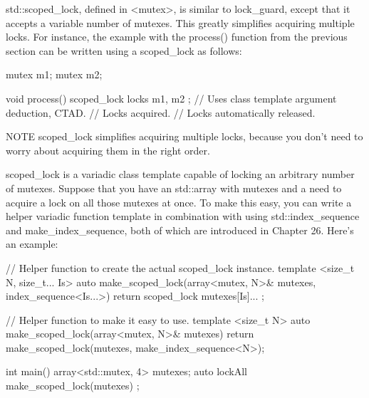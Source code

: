 
std::scoped\_lock, defined in <mutex>, is similar to lock\_guard, except that it accepts a variable number of mutexes. This greatly simplifies acquiring multiple locks. For instance, the example with the process() function from the previous section can be written using a scoped\_lock as follows:

\begin{cpp}
mutex m1;
mutex m2;

void process()
{
    scoped_lock locks { m1, m2 }; // Uses class template argument deduction, CTAD.
    // Locks acquired.
} // Locks automatically released.
\end{cpp}

\begin{myNotic}{NOTE}
scoped\_lock simplifies acquiring multiple locks, because you don’t need to worry about acquiring them in the right order.
\end{myNotic}

scoped\_lock is a variadic class template capable of locking an arbitrary number of mutexes. Suppose that you have an std::array with mutexes and a need to acquire a lock on all those mutexes at once. To make this easy, you can write a helper variadic function template in combination with using std::index\_sequence and make\_index\_sequence, both of which are introduced in Chapter 26. Here’s an example:

\begin{cpp}
// Helper function to create the actual scoped_lock instance.
template <size_t N, size_t... Is>
auto make_scoped_lock(array<mutex, N>& mutexes, index_sequence<Is...>)
{
    return scoped_lock { mutexes[Is]... };
}

// Helper function to make it easy to use.
template <size_t N>
auto make_scoped_lock(array<mutex, N>& mutexes)
{
    return make_scoped_lock(mutexes, make_index_sequence<N>{});
}

int main()
{
    array<std::mutex, 4> mutexes;
    auto lockAll { make_scoped_lock(mutexes) };
}
\end{cpp}



